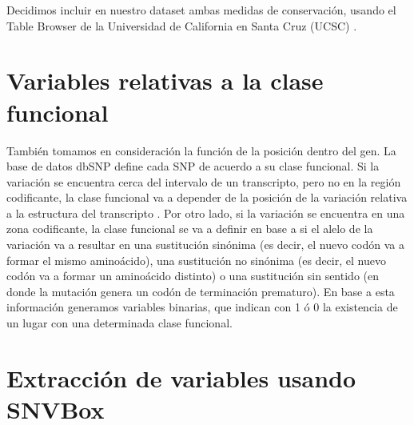 Decidimos incluir en nuestro dataset ambas medidas de conservación, usando el Table Browser de la Universidad de California en Santa Cruz (UCSC) \cite{Karolchik2004}.

\section{Variables relativas a la clase funcional}

También tomamos en consideración la función de la posición dentro del gen. La base de datos dbSNP define cada SNP de acuerdo a su clase funcional. Si la variación se encuentra cerca del intervalo de un transcripto, pero no en la región codificante, la clase funcional va a depender de la posición de la variación relativa a la estructura del transcripto \cite{Ostell2007}.  Por otro lado, si la variación se encuentra en una zona codificante, la clase funcional se va a definir en base a si el alelo de la variación va a resultar en una sustitución sinónima (es decir, el nuevo codón va a formar el mismo aminoácido), una sustitución no sinónima (es decir, el nuevo codón va a formar un aminoácido distinto) o una sustitución sin sentido (en donde la mutación genera un codón de terminación prematuro). En base a esta información generamos variables binarias, que indican con 1 ó 0 la existencia de un lugar con una determinada clase funcional.


 

\section{Extracción de variables usando SNVBox}

